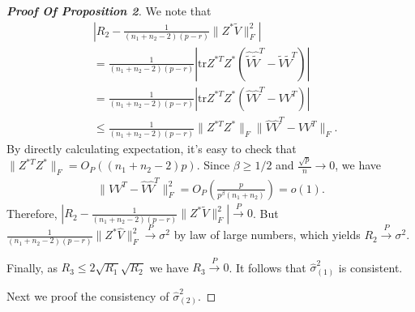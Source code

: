 \begin{proof}[\textbf{Proof Of Proposition 2}]
    We note that
    \begin{equation}
        \begin{aligned}
            &|R_2-\frac{1}{(n_1+n_2-2)(p-r)}\|Z^*\tilde{V}\|_F^2|\\
            &=
            \frac{1}{(n_1+n_2-2)(p-r)}|\mathrm{tr}Z^{*T}Z^*(\hat{\tilde{V}}\hat{\tilde{V}}^T-\tilde{V}\tilde{V}^T)|\\
            &=\frac{1}{(n_1+n_2-2)(p-r)}|\mathrm{tr}Z^{*T}Z^*(\hat{V}\hat{V}^T-VV^T)|\\
            &\leq \frac{1}{(n_1+n_2-2)(p-r)}\|Z^{*T}Z^*\|_F\|\hat{V}\hat{V}^T-VV^T\|_F.
        \end{aligned}
    \end{equation}
    By directly calculating expectation, it's easy to check that $\|Z^{*T}Z^*\|_F=O_P((n_1+n_2-2)p)$. Since $\beta\geq 1/2$  and $\frac{\sqrt{p}}{n}\to 0$, we have
    \begin{equation}
        \begin{aligned}
            \|VV^T -\hat{V}\hat{V}^T\|_F^2=O_P(\frac{p}{p^{\beta}(n_1+n_2)})=o(1).
    \end{aligned}
    \end{equation}
     Therefore, $|R_2-\frac{1}{(n_1+n_2-2)(p-r)}\|Z^*\tilde{V}\|_F^2|\xrightarrow{P}0$. But $\frac{1}{(n_1+n_2-2)(p-r)}\|Z^*\hat{V}\|_F^2\xrightarrow{P}\sigma^2$ by law of large numbers, which yields $R_2\xrightarrow{P}\sigma^2$.

    Finally, as $R_3\leq 2\sqrt{R_1}\sqrt{R_2}$ we have $R_3\xrightarrow{P}0$. It follows that $\hat{\sigma}^2_{(1)}$ is consistent.

Next we proof the consistency of $\hat{\sigma}^2_{(2)}$.


\end{proof}
